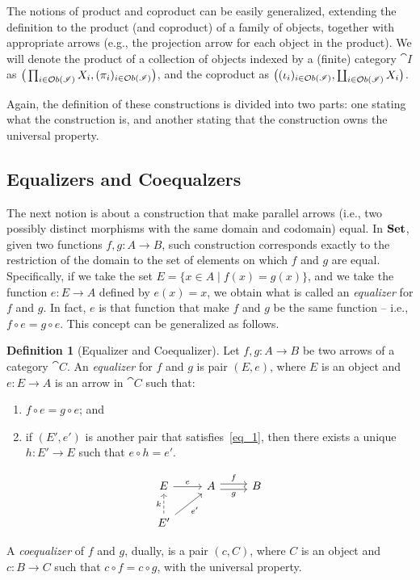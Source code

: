 \documentclass[a4paper, twoside,openright]{report}
\theoremstyle{plain}
\theoremstyle{definition}
\newtheorem{definition}[theorem]{Definition}
\begin{document}
The notions of product and coproduct can be easily generalized, extending the definition to the product (and coproduct) of a family of objects, together with appropriate arrows (e.g., the projection arrow for each object in the product). We will denote the product of a collection of objects indexed by a (finite) category $\cat I$ as $\big(\prod_{i \in \mathcal{O}b(\mathscr{I})} X_i, (\pi_i)_{i \in \mathcal{O}b(\mathscr{I})}\big)$, and the coproduct as $\big((\iota_i)_{i \in \mathcal{O}b(\mathscr{I})}, \coprod_{i \in \mathcal{O}b(\mathscr{I})} X_i\big)$.

Again, the definition of these constructions is divided into two parts: one stating what the construction is, and another stating that the construction owns the universal property.

\subsection{Equalizers and Coequalzers}

The next notion is about a construction that make parallel arrows (i.e., two possibly distinct morphisms with the same domain and codomain) equal. In $\mathbf{Set}$, given two functions $f, g: A \rightarrow B$, such construction corresponds exactly to the restriction of the domain to the set of elements on which $f$ and $g$ are equal. Specifically, if we take the set $E = \{x \in A \mid f(x) = g(x)\}$, and we take the function $e: E \rightarrow A$ defined by $e(x) = x$, we obtain what is called an \emph{equalizer} for $f$ and $g$. In fact, $e$ is that function that make $f$ and $g$ be the same function -- i.e., $f \circ e = g \circ e$.
This concept can be generalized as follows.

\begin{definition}[Equalizer and Coequalizer]
    Let $f, g: A \rightarrow B$ be two arrows of a category $\cat C$. An \emph{equalizer} for $f$ and $g$ is pair $(E, e)$, where $E$ is an object and $e: E \rightarrow A$ is an arrow in $\cat C$ such that:
    \begin{enumerate}
        \item \label{eq_1} $ f \circ e = g \circ e$; and
        \item if $(E', e')$ is another pair that satisfies~\ref{eq_1}, then there exists a unique $h: E' \rightarrow E$ such that $e \circ h = e'$.
    \end{enumerate}
    \[
        \begin{tikzcd}
            E \arrow[r, "e"] & A \arrow[r, shift left, "f"] \arrow[r, shift right, "g" swap] & B \\
            E' \arrow[u, dashed, "k"] \arrow[ur, "e'" swap] & 
        \end{tikzcd}
    \]

    A \emph{coequalizer} of $f$ and $g$, dually, is a pair $(c, C)$, where $C$ is an object and $c: B \rightarrow C$ such that $c \circ f = c \circ g$, with the universal property.
\end{definition}
\end{document}

